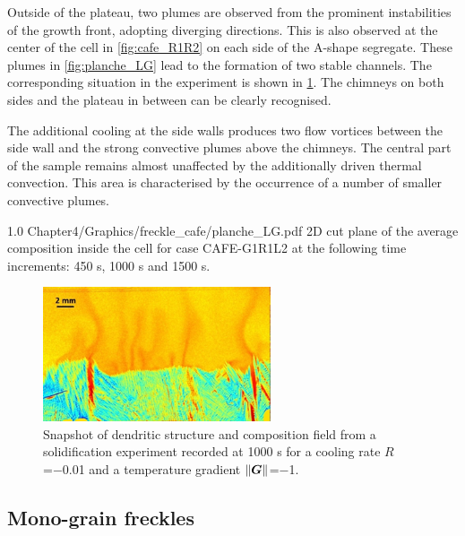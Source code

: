 Outside of the plateau, two plumes are observed from the prominent instabilities of the growth front, adopting diverging directions. 
This is also observed at the center of the cell in \cref{fig:cafe_R1R2} on each side of the A-shape segregate. 
These plumes in \cref{fig:planche_LG} lead to the formation of two stable channels. 
The corresponding situation in the experiment is shown in \cref{fig:exp_G1R1}. The chimneys on both sides and the plateau in between can be clearly 
recognised. 

The additional cooling at the side walls produces two flow vortices between the side wall and the strong convective plumes above the 
chimneys. The central part of the sample remains almost unaffected by the additionally driven thermal convection. This area is characterised by 
the occurrence of a number of smaller convective plumes.  

\begin{figureth}
{1.0}
{Chapter4/Graphics/freckle_cafe/planche_LG.pdf}
{2D cut plane of the average composition inside the cell for case CAFE-G1R1L2 at the 
following time increments: 450 s, 1000 s and 1500 s.}
\label{fig:planche_LG}
\end{figureth}

\begin{figure}[htbp]
\centering
\includegraphics[width=0.6\textwidth]{Chapter4/Graphics/freckle_exp/exp_G1R1.png}
\captionsetup{singlelinecheck=off}
\caption[.]{Snapshot of dendritic structure and composition field from a 
solidification experiment recorded at 1000 s for a cooling rate $R$=\SI{-0.01}{\uCR} and a temperature gradient $\lVert \boldsymbol{G} \rVert$=\SI{-1}{\ugradT}.}
\label{fig:exp_G1R1}
\end{figure}


\subsection{Mono-grain freckles}

